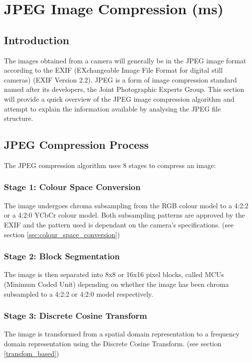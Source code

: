 
\section{JPEG Image Compression (ms)}
\label{jpeg_image_compression}
\subsection{Introduction}
The images obtained from a camera will generally be in the JPEG image format
according to the 
EXIF (EXchangeable Image File Format for digital still cameras)
 (EXIF Version 2.2)\cite{exif_std}. 
JPEG is a form of image compression standard named after its developers, 
the Joint Photographic Experts Group\cite{winzip_jpeg_compression}.
This section will provide a quick overview of the JPEG image compression algorithm
and attempt to explain the information available by
analysing the JPEG file structure.

\subsection{JPEG Compression Process}

The JPEG compression algorithm uses 8 
stages to compress an image: \cite{hass_impulse_jpeg}

\subsubsection{Stage 1: Colour Space Conversion}
The image undergoes chroma subsampling from the 
RGB colour model to a 4:2:2 or a 4:2:0 YCbCr colour model. 
Both subsampling patterns are approved by the
EXIF and the pattern used is dependant on the camera's specifications. 
(see section \ref{sec:colour_space_conversion})

\subsubsection{Stage 2: Block Segmentation}
The image is then separated into 8x8 or 16x16 pixel blocks,
called MCUs (Minimum Coded Unit) 
depending on whether the image has been chroma
subsampled to a 4:2:2 or 4:2:0 model respectively\cite{exif_std}.

\subsubsection{Stage 3: Discrete Cosine Transform}
The image is transformed from a spatial domain 
representation to a frequency domain representation
using the Discrete Cosine Transform\cite{hass_impulse_jpeg}.
(see section \ref{transfom_based})

